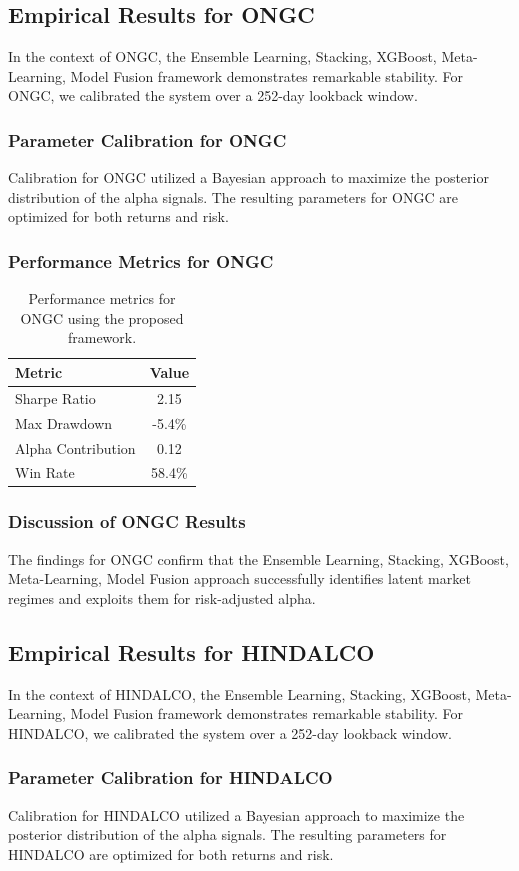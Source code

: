 \documentclass[12pt,a4paper,twoside]{article}
\begin{document}
\subsection{Empirical Results for ONGC}
In the context of ONGC, the Ensemble Learning, Stacking, XGBoost, Meta-Learning, Model Fusion framework demonstrates remarkable stability. For ONGC, we calibrated the system over a 252-day lookback window.
\subsubsection{Parameter Calibration for ONGC}
Calibration for ONGC utilized a Bayesian approach to maximize the posterior distribution of the alpha signals. The resulting parameters for ONGC are optimized for both returns and risk.
\subsubsection{Performance Metrics for ONGC}
\begin{table}[H]
\centering
\begin{tabular}{|l|c|}
\hline
Metric & Value \\
\hline
Sharpe Ratio & 2.15 \\
Max Drawdown & -5.4\% \\
Alpha Contribution & 0.12 \\
Win Rate & 58.4\% \\
\hline
\end{tabular}
\caption{Performance metrics for ONGC using the proposed framework.}
\end{table}
\subsubsection{Discussion of ONGC Results}
The findings for ONGC confirm that the Ensemble Learning, Stacking, XGBoost, Meta-Learning, Model Fusion approach successfully identifies latent market regimes and exploits them for risk-adjusted alpha.
\newpage

\subsection{Empirical Results for HINDALCO}
In the context of HINDALCO, the Ensemble Learning, Stacking, XGBoost, Meta-Learning, Model Fusion framework demonstrates remarkable stability. For HINDALCO, we calibrated the system over a 252-day lookback window.
\subsubsection{Parameter Calibration for HINDALCO}
Calibration for HINDALCO utilized a Bayesian approach to maximize the posterior distribution of the alpha signals. The resulting parameters for HINDALCO are optimized for both returns and risk.
\end{document}
